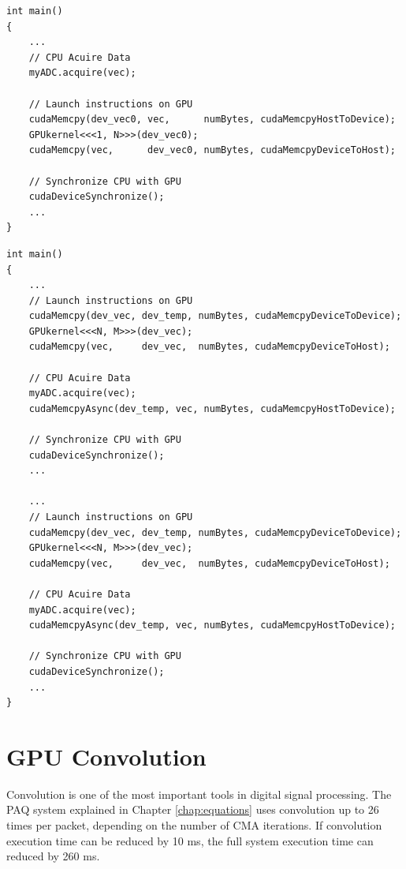 \singlespacing
\clearpage
\begin{lstlisting}[style=myCUDAstyle,caption={Example code Simple example of the CPU acquiring data from myADC, copying from host to device, processing data on the device then copying from device to host. No processing occurs on device while CPU is acquiring data.},label={code:noPipe}]
int main()
{
	...
	// CPU Acuire Data
	myADC.acquire(vec);
	
	// Launch instructions on GPU 
	cudaMemcpy(dev_vec0, vec,      numBytes, cudaMemcpyHostToDevice);
	GPUkernel<<<1, N>>>(dev_vec0);
	cudaMemcpy(vec,      dev_vec0, numBytes, cudaMemcpyDeviceToHost);
	
	// Synchronize CPU with GPU
	cudaDeviceSynchronize();
	...
}
\end{lstlisting}
\doublespacing
\singlespacing
\begin{lstlisting}[style=myCUDAstyle,caption={Example code Simple of the CPU acquiring data from myADC, copying from host to device, processing data on the device then copying from device to host. No processing occurs on device while CPU is acquiring data.},label={code:pipe}]
int main()
{
	...
	// Launch instructions on GPU 
	cudaMemcpy(dev_vec, dev_temp, numBytes, cudaMemcpyDeviceToDevice);
	GPUkernel<<<N, M>>>(dev_vec);
	cudaMemcpy(vec,     dev_vec,  numBytes, cudaMemcpyDeviceToHost);
	
	// CPU Acuire Data
	myADC.acquire(vec);
	cudaMemcpyAsync(dev_temp, vec, numBytes, cudaMemcpyHostToDevice);
	
	// Synchronize CPU with GPU
	cudaDeviceSynchronize();
	...
	
	...
	// Launch instructions on GPU 
	cudaMemcpy(dev_vec, dev_temp, numBytes, cudaMemcpyDeviceToDevice);
	GPUkernel<<<N, M>>>(dev_vec);
	cudaMemcpy(vec,     dev_vec,  numBytes, cudaMemcpyDeviceToHost);
	
	// CPU Acuire Data
	myADC.acquire(vec);
	cudaMemcpyAsync(dev_temp, vec, numBytes, cudaMemcpyHostToDevice);
	
	// Synchronize CPU with GPU
	cudaDeviceSynchronize();
	...
}
\end{lstlisting}
\doublespacing

\clearpage
\section{GPU Convolution}
\label{chap:gpu_convolution}
Convolution is one of the most important tools in digital signal processing.
The PAQ system explained in Chapter \ref{chap:equations} uses convolution up to 26 times per packet, depending on the number of CMA iterations.
If convolution execution time can be reduced by 10 ms, the full system execution time can reduced by 260 ms.

